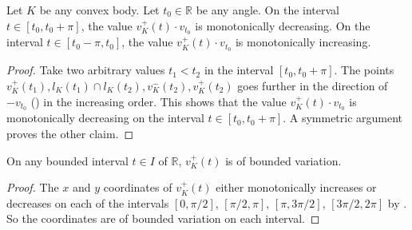 \begin{theorem}

Let \(K\) be any convex body. Let \(t_0 \in \mathbb{R}\) be any angle. On the interval \(t \in [t_0, t_0 + \pi]\), the value \(v_K^+(t) \cdot v_{t_0}\) is monotonically decreasing. On the interval \(t \in [t_0 - \pi, t_0]\), the value \(v_K^+(t) \cdot v_{t_0}\) is monotonically increasing.

\label{thm:vertex-monotone}
\end{theorem}

\begin{proof}
Take two arbitrary values \(t_1 < t_2\) in the interval \([t_0, t_0 + \pi]\). The points \(v_K^+(t_1), l_K(t_1) \cap l_K(t_2), v_K^-(t_2), v_K^+(t_2)\) goes further in the direction of \(-v_{t_0}\) () in the increasing order. This shows that the value \(v_K^+(t) \cdot v_{t_0}\) is monotonically decreasing on the interval \(t \in [t_0, t_0 + \pi]\). A symmetric argument proves the other claim.
\end{proof}

\begin{theorem}

On any bounded interval \(t \in I\) of \(\mathbb{R}\), \(v_K^+(t)\) is of bounded variation.

\label{thm:vertex-bounded-variation}
\end{theorem}

\begin{proof}
The \(x\) and \(y\) coordinates of \(v_K^+(t)\) either monotonically increases or decreases on each of the intervals \([0, \pi/2]\), \([\pi/2, \pi]\), \([\pi, 3\pi/2]\), \([3\pi/2, 2\pi]\) by . So the coordinates are of bounded variation on each interval.
\end{proof}